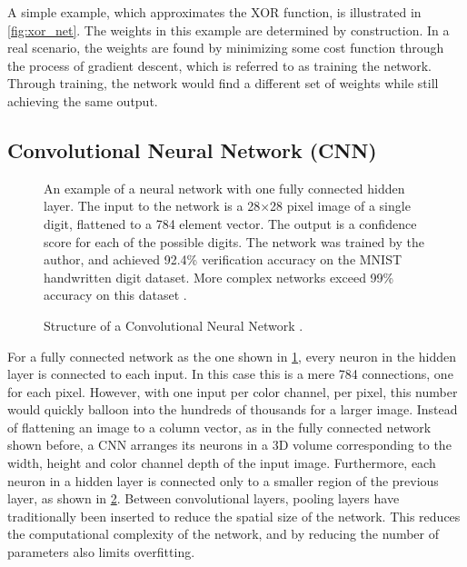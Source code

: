 \documentclass[\rootfolder/main.tex]{subfiles}
\begin{document}
A simple example, which approximates the XOR function, is illustrated in \cref{fig:xor_net}.
The weights in this example are determined by construction.
In a real scenario, the weights are found by minimizing some cost function through the process of gradient descent, which is referred to as training the network\cite{Mitchell1997}.
Through training, the network would find a different set of weights while still achieving the same output.

\subsection{Convolutional Neural Network (CNN)}

\begin{figure}
    \caption[An example of a neural network with one fully connected hidden layer]%
        {An example of a neural network with one fully connected hidden layer. %
         The input to the network is a 28$\times$28 pixel image of a single digit, flattened to a 784 element vector. %
         The output is a confidence score for each of the possible digits. %
         The network was trained by the author, and achieved 92.4\% verification accuracy on the MNIST handwritten digit dataset. %
         More complex networks exceed 99\% accuracy on this dataset \cite{mnist2010}.\label{fig:mnist-net}}
\end{figure}

\begin{figure}
    \caption{Structure of a Convolutional Neural Network \cite{Mathworks}.\label{fig:cnn-classification}}
\end{figure}

For a fully connected network as the one shown in \cref{fig:mnist-net}, every neuron in the hidden layer is connected to each input.
In this case this is a mere 784 connections, one for each pixel.
However, with one input per color channel, per pixel, this number would quickly balloon into the hundreds of thousands for a larger image.
Instead of flattening an image to a column vector, as in the fully connected network shown before, a CNN arranges its neurons in a 3D volume corresponding to the width, height and color channel depth of the input image.
Furthermore, each neuron in a hidden layer is connected only to a smaller region of the previous layer, as shown in \cref{fig:cnn-classification}.
Between convolutional layers, pooling layers have traditionally been inserted to reduce the spatial size of the network.
This reduces the computational complexity of the network, and by reducing the number of parameters also limits overfitting.
\end{document}
